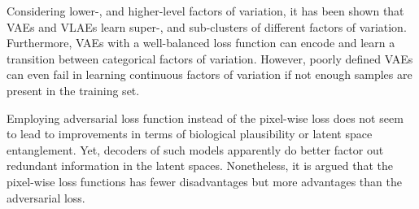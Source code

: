 Considering lower-, and higher-level factors of variation, it has been shown that \acp{VAE} and \acp{VLAE} learn super-, and sub-clusters of different factors of variation.
Furthermore, \acp{VAE} with a well-balanced loss function can encode and learn a transition between categorical factors of variation.
However, poorly defined \acp{VAE} can even fail in learning continuous factors of variation if not enough samples are present in the training set.

Employing adversarial loss function instead of the pixel-wise loss does not seem to lead to improvements in terms of biological plausibility or latent space entanglement.
Yet, decoders of such models apparently do better factor out redundant information in the latent spaces.
Nonetheless, it is argued that the pixel-wise loss functions has fewer disadvantages but more advantages than the adversarial loss.
